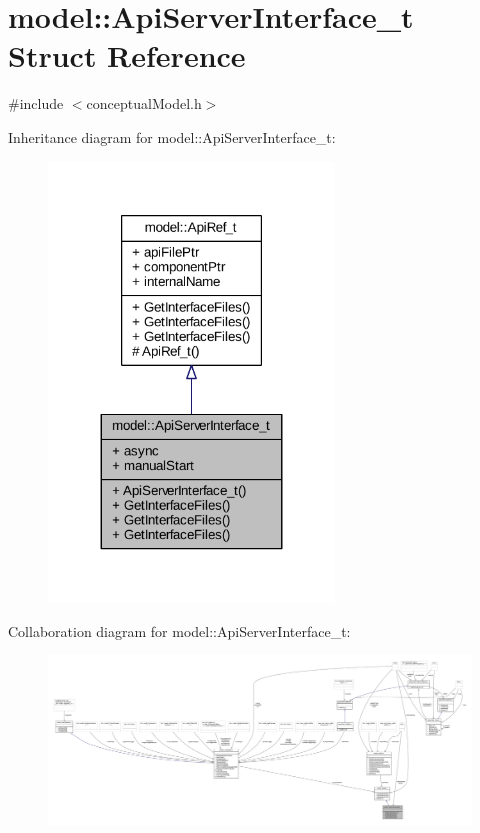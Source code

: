 \hypertarget{structmodel_1_1_api_server_interface__t}{}\section{model\+:\+:Api\+Server\+Interface\+\_\+t Struct Reference}
\label{structmodel_1_1_api_server_interface__t}


{\ttfamily \#include $<$conceptual\+Model.\+h$>$}



Inheritance diagram for model\+:\+:Api\+Server\+Interface\+\_\+t\+:
\nopagebreak
\begin{figure}[H]
\begin{center}
\leavevmode
\includegraphics[width=215pt]{structmodel_1_1_api_server_interface__t__inherit__graph}
\end{center}
\end{figure}


Collaboration diagram for model\+:\+:Api\+Server\+Interface\+\_\+t\+:
\nopagebreak
\begin{figure}[H]
\begin{center}
\leavevmode
\includegraphics[width=350pt]{structmodel_1_1_api_server_interface__t__coll__graph}
\end{center}
\end{figure}
